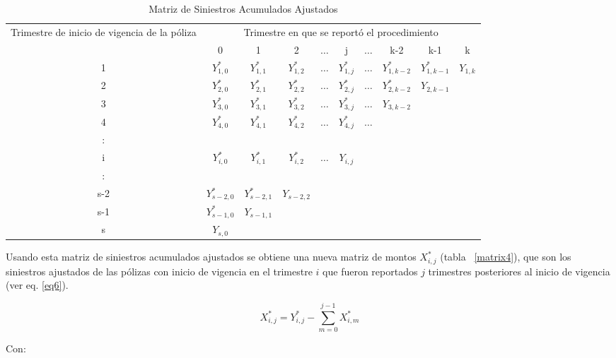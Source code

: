 \documentclass[11pt,twoside,openright,spanish]{report}
\numberwithin{equation}{chapter}
\numberwithin{figure}{chapter}
\numberwithin{table}{chapter}
\begin{document}
	\begin{table}[ht]
		\centering

		\begin{tabularx}{\linewidth}{ c |ccccccccc}
			\multirow{2}{4cm}{Trimestre de inicio de vigencia de la póliza}
			& \multicolumn{9}{c}{Trimestre en que se reportó el procedimiento} \\ 
			& 0  & 1 & 2 & $ \dots $ & j & $\dots $ & k-2 & k-1 &  k \\
			\midrule
			1      &  $Y_{1,0}^{*}$ & $Y_{1,1}^{*}$ & $Y_{1,2}^{*}$ & $ \dots $ & $Y_{1,j}^{*}$ & $ \dots $ & $Y_{1,k-2}^{*}$ & $Y_{1,k-1}^{*}$ & $Y_{1,k}^{}$ \\
			2      &  $Y_{2,0}^{*}$ & $Y_{2,1}^{*}$ & $Y_{2,2}^{*}$ & $ \dots $ & $Y_{2,j}^{*}$ & $ \dots $ & $Y_{2,k-2}^{*}$ & $Y_{2,k-1}^{}$ & \\
			3      &  $Y_{3,0}^{*}$ & $Y_{3,1}^{*}$ & $Y_{3,2}^{*}$ & $ \dots $ & $Y_{3,j}^{*}$ & $ \dots $ & $Y_{3,k-2}^{}$ & & \\
			4      &  $Y_{4,0}^{*}$ & $Y_{4,1}^{*}$ & $Y_{4,2}^{*}$ & $ \dots $ & $Y_{4,j}^{*}$ & $ \dots $ & & & \\
			:      & & & & & & & & & \\
			i      &  $Y_{i,0}^{*}$ & $Y_{i,1}^{*}$ & $Y_{i,2}^{*}$ & $ \dots $ & $Y_{i,j}^{}$ & & & & \\
			:      & & & & & & & & & \\
			s-2      &  $Y_{s-2,0}^{*}$ & $Y_{s-2,1}^{*}$ & $Y_{s-2,2}^{}$ & & & & & & \\
			s-1      &  $Y_{s-1,0}^{*}$ & $Y_{s-1,1}^{}$ & & & & & & & \\
			s      &  $Y_{s,0}^{}$ & & & & & & & & \\
		\end{tabularx}
			\caption{Matriz de Siniestros Acumulados Ajustados}
	\label{matrix3}
	\end{table}
	
	Usando esta matriz de siniestros acumulados ajustados se obtiene una nueva matriz de montos $X_{i,j}^{*}$ (tabla ~\ref{matrix4}), que son los siniestros ajustados de las pólizas con inicio de vigencia en el trimestre $i$ que fueron reportados $j$ trimestres posteriores al inicio de vigencia (ver eq. \ref{eq6}).
	
	\begin{equation}
	{X}_{i,j}^{*}={Y}_{i,j}^{*}-\sum _{m=0}^{j-1}{X}_{i,m}^{*}
	\label{eq6}
	\end{equation}	
	 
	Con:
	
\end{document}
